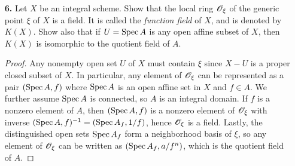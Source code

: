\documentclass{article}
\begin{document}
\begin{enumerate} [label=\textbf{\arabic*.}, leftmargin=0em]
\begin{proof}
    Let $f : X \to Y$ be a finite morphism of schemes. Then there exists an open covering of $Y$ by sets $V_i = \spec{B_i}$, such that for each $i$, $f^{-1}(V_i)$ is affine, equal to $\spec{A_i}$, where $A_i$ is a finite $B_i$-module. Let $V = \spec{B}$ be an open subset of $Y$. By Nike's trick, we can cover $V$ by open affines that are distinguished open set in $V$ and some $V_i$, i.e., open sets of the form $\spec{B_g} = \spec{(B_i)_{h}}$ for some $g \in B, h \in B_i$. Since $V$ is quasi-compact, a finite number will do. By lemma 1, $f^{-1}(\spec(B_i)_h) = \spec{(A_i)_h} \subseteq f^{-1}(V)$. Since $(A_i)_h$ is a finite $(B_i)_h$-module and $B_g \cong (B_i)_h$, we deduce that there exists a finite cover of $V$ by basic open sets $\spec{B_{g_j}}$ for some $g_j \in B$ such that $f^{-1}(\spec{B_{g_j}}) = \spec{C_j}$, where each $C_j$ is a finite $B_{g_j}$-module. We show $X' = f^{-1}(V)$ is affine using the criterion in (Ex. 2.17b). The restriction of $f$ to $X' \to \spec{B}$ induces a ring homomorphism $B \to A = \Gamma(X', \fO_X)$. Denote $\bar{g}_i$ the image of $g_i$ in $A$. Since $g_i$ generate the unit ideal in $B$, its image in $A$ also generate the unit ideal. Also, by lemma 1 $X'_{\bar{g}_j} = f^{-1}(\spec{B_{g_j}}) = \spec{C_j}$, hence $X' = \spec{A}$. It remains to show $A$ is a finite $B$-module, which we reduce to the following algebraic problem: let $A$ be a $B$-algebra, let $g_i \in B$ $(1 \leq i \leq n)$ generate the unit ideal, and suppose $A_{g_i}$ is a finite $B_{g_i}$-module. Then $A$ is a finite $B$-module. The proof is identical to (Ex. 3.3c), so we omit this part.
\end{proof}

\item[\textbf{6.}] Let $X$ be an integral scheme. Show that the local ring $\mathscr{O}_\xi$ of the generic point $\xi$ of $X$ is a field. It is called the \textit{function field} of $X$, and is denoted by $K(X)$. Show also that if $U = \operatorname{Spec}{A}$ is any open affine subset of $X$, then $K(X)$ is isomorphic to the quotient field of $A$.

\begin{proof}
    Any nonempty open set $U$ of $X$ must contain $\xi$ since $X - U$ is a proper closed subset of $X$. In particular, any element of $\mathscr{O}_\xi$ can be represented as a pair $(\operatorname{Spec}{A}, f)$ where $\operatorname{Spec}{A}$ is an open affine set in $X$ and $f \in A$. We further assume $\operatorname{Spec}{A}$ is connected, so $A$ is an integral domain. If $f$ is a nonzero element of $A$, then $(\operatorname{Spec}{A}, f)$ is a nonzero element of $\mathscr{O}_\xi$ with inverse $(\operatorname{Spec}{A}, f)^{-1} = (\operatorname{Spec}{A_f}, 1/f)$, hence $\mathscr{O}_\xi$ is a field. Lastly, the distinguished open sets $\operatorname{Spec}{A_f}$ form a neighborhood basis of $\xi$, so any element of $\mathscr{O}_\xi$ can be written as $(\operatorname{Spec}{A_f}, a / f^n)$, which is the quotient field of $A$.
\end{proof}


\end{enumerate}
\end{document}
